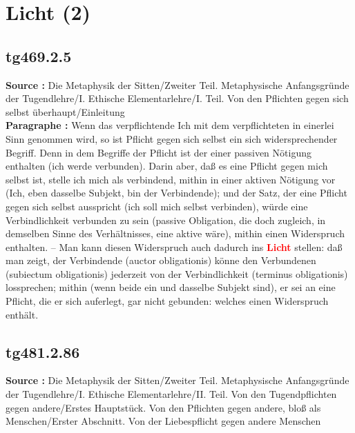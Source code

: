 \documentclass[a4paper,12pt,twoside]{book}
\newcommand{\match}[1]{\textcolor{red}{\textbf{#1}}}
\newcommand{\unnumberedsection}[1]{
	\section*{#1}
	\addcontentsline{toc}{section}{#1}
	\markright{#1}
}
\begin{document}
	\unnumberedsection{Licht (2)} 
	\subsection*{tg469.2.5} 
	\textbf{Source : }Die Metaphysik der Sitten/Zweiter Teil. Metaphysische Anfangsgründe der Tugendlehre/I. Ethische Elementarlehre/I. Teil. Von den Pflichten gegen sich selbst überhaupt/Einleitung\\  
	
	\textbf{Paragraphe : }Wenn das verpflichtende Ich mit dem verpflichteten in einerlei Sinn genommen wird, so ist Pflicht gegen sich selbst ein sich widersprechender Begriff. Denn in dem Begriffe der Pflicht ist der einer passiven Nötigung enthalten (ich werde verbunden). Darin aber, daß es eine Pflicht gegen mich selbst ist, stelle ich mich als verbindend, mithin in einer aktiven Nötigung vor (Ich, eben dasselbe Subjekt, bin der Verbindende); und der Satz, der eine Pflicht gegen sich selbst ausspricht (ich soll mich selbst verbinden), würde eine Verbindlichkeit verbunden zu sein (passive Obligation, die doch zugleich, in demselben Sinne des Verhältnisses, eine aktive wäre), mithin einen Widerspruch enthalten. – Man kann diesen Widerspruch auch dadurch ins \match{Licht} stellen: daß man zeigt, der Verbindende (auctor obligationis) könne den Verbundenen (subiectum obligationis) jederzeit von der Verbindlichkeit (terminus obligationis) lossprechen; mithin (wenn beide ein und dasselbe Subjekt sind), er sei an eine Pflicht, die er sich auferlegt, gar nicht gebunden: welches einen Widerspruch enthält. 
	
	\subsection*{tg481.2.86} 
	\textbf{Source : }Die Metaphysik der Sitten/Zweiter Teil. Metaphysische Anfangsgründe der Tugendlehre/I. Ethische Elementarlehre/II. Teil. Von den Tugendpflichten gegen andere/Erstes Hauptstück. Von den Pflichten gegen andere, bloß als Menschen/Erster Abschnitt. Von der Liebespflicht gegen andere Menschen\\  
	
\end{document}
